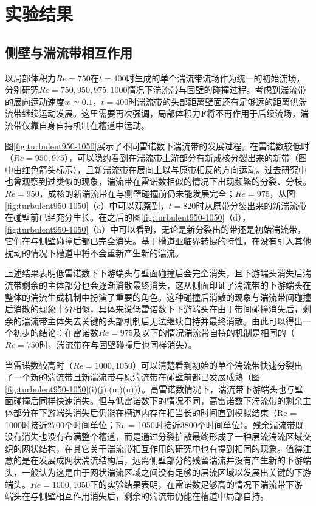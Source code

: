 \section{实验结果}
\subsection{侧壁与湍流带相互作用}
以局部体积力$Re = 750$在$t=400$时生成的单个湍流带流场作为统一的初始流场，分别研究$Re = 750,950,975,1000$情况下湍流带与固壁的碰撞过程。考虑到湍流带的展向运动速度$w \simeq 0.1$，$t = 400$时湍流带的头部距离壁面还有足够远的距离供湍流带继续运动发展。这里需要再次强调，局部体积力$\bm F$将不再作用于后续流场，湍流带仅靠自身自持机制在槽道中运动。

图\ref{fig:turbulent950-1050}展示了不同雷诺数下湍流带的发展过程。在雷诺数较低时（$Re=950,975$），可以隐约看到在湍流带上游部分有新成核分裂出来的新带（图中由红色箭头标示），且新湍流带在展向上以与原带相反的方向运动。过去研究中也曾观察到过类似的现象\cite{Paranjape2019,Shimizu2019}，湍流带在雷诺数相似的情况下出现频繁的分裂、分枝。$Re=950$，成核的新湍流带在与侧壁碰撞前仍未能发展完全；$Re=975$，从图\ref{fig:turbulent950-1050}（e）中可以观察到，$t=820$时从原带分裂出来的新湍流带在碰壁前已经充分生长。在之后的图\ref{fig:turbulent950-1050}（d），\ref{fig:turbulent950-1050}（h）中可以看到，无论是新分裂出的带还是初始湍流带，它们在与侧壁碰撞后都已完全消失。基于槽道亚临界转捩的特性，在没有引入其他扰动的情况下槽道中将不会重新产生新的湍流。

上述结果表明低雷诺数下下游端头与壁面碰撞后会完全消失，且下游端头消失后湍流带剩余的主体部分也会逐渐消散最终消失，这从侧面印证了湍流带的下游端头在整体的湍流生成机制中扮演了重要的角色。这种碰撞后消散的现象与湍流带间碰撞后消散的现象十分相似\cite{Shimizu2019,Song2020}，具体来说低雷诺数下下游端头在由于带间碰撞消失后，剩余的湍流带主体失去关键的头部机制后无法继续自持并最终消散。由此可以得出一个初步的结论：在雷诺数$Re=975$及以下的情况湍流带自持的机制是相同的（$Re=750$时，湍流带在与固壁碰撞后也同样消失）。

当雷诺数较高时（$Re = 1000,1050$）可以清楚看到初始的单个湍流带快速分裂出了一个新的湍流带且新湍流带与原湍流带在碰壁前都已发展成熟（图\ref{fig:turbulent950-1050}(i)(j),(m)(n))）。高雷诺数情况下，湍流带下游端头也与壁面碰撞后同样快速消失。但与低雷诺数下的情况不同，高雷诺数下湍流带的剩余主体部分在下游端头消失后仍能在槽道内存在相当长的时间直到模拟结束（Re = 1000时接近2700个时间单位；Re = 1050时接近3800个时间单位）。残余湍流带既没有消失也没有布满整个槽道，而是通过分裂扩散最终形成了一种层流湍流区域交织的网状结构，在其它关于湍流带相互作用的研究\cite{Paranjape2019, Shimizu2019, Duguet2020}中也有提到相同的现象。值得注意的是在发展成网状湍流结构后，远离侧壁部分的残留湍流并没有产生新的下游端头，一般认为这是由于网状湍流区域之间没有足够的层流区域以发展出关键的下游端头\cite{Shimizu2019}。$Re = 1000,1050$下的实验结果表明，在雷诺数足够高的情况下湍流带下游端头在与侧壁相互作用消失后，剩余的湍流带仍能在槽道中局部自持。

